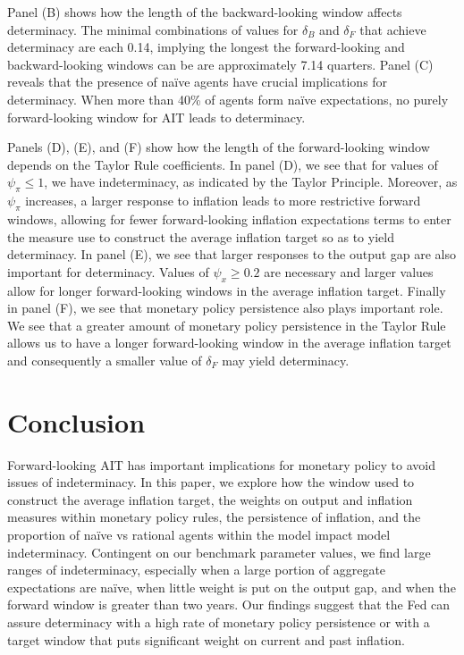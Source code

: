 \documentclass[english,authoryear,12pt]{elsarticle}
\begin{document}
Panel (B) shows how the length of the backward-looking window affects determinacy. The minimal combinations of values for $\delta_B$ and $\delta_F$ that achieve determinacy are each 0.14, implying the longest the forward-looking and backward-looking windows can be are approximately 7.14 quarters. Panel (C) reveals that the presence of na\"ive agents have crucial implications for determinacy. When more than 40\% of agents form na\"ive expectations, no purely forward-looking window for AIT leads to determinacy.

Panels (D), (E), and (F) show how the length of the forward-looking window depends on the Taylor Rule coefficients. In panel (D), we see that for values of $\psi_\pi \leq 1$, we have indeterminacy, as indicated by the Taylor Principle. Moreover, as $\psi_\pi$ increases, a larger response to inflation leads to more restrictive forward windows, allowing for fewer forward-looking inflation expectations terms to enter the measure use to construct the average inflation target so as to yield determinacy. In panel (E), we see that larger responses to the output gap are also important for determinacy. Values of $\psi_x \geq 0.2$ are necessary and larger values allow for longer forward-looking windows in the average inflation target.  Finally in panel (F), we see that monetary policy persistence also plays important role. We see that a greater amount of monetary policy persistence in the Taylor Rule allows us to have a longer forward-looking window in the average inflation target and consequently a smaller value of $\delta_F$ may yield determinacy.

\section{\label{Conc}Conclusion}

Forward-looking AIT has important implications for monetary policy to avoid issues of indeterminacy. In this paper, we explore how the window used to construct the average inflation target, the weights on output and inflation measures within monetary policy rules, the persistence of inflation, and the proportion of na\"ive vs rational agents within the model impact model indeterminacy. Contingent on our benchmark parameter values, we find large ranges of indeterminacy, especially when a large portion of aggregate expectations are na\"ive, when little weight is put on the output gap, and when the forward window is greater than two years. Our findings suggest that the Fed can assure determinacy with a high rate of monetary policy persistence or with a target window that puts significant weight on current and past inflation.



\end{document}

